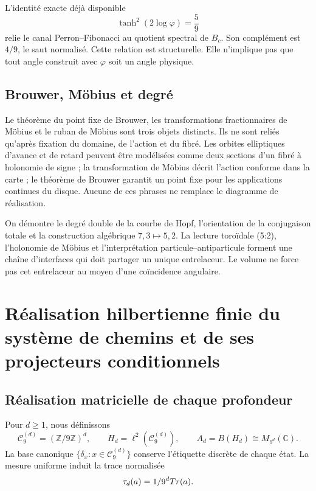 L’identité exacte déjà disponible
\[
\tanh^2(2\log\varphi)=\frac59
\]
relie le canal Perron--Fibonacci au quotient spectral de \(B_c\). Son
complément est \(4/9\), le saut normalisé. Cette relation est structurelle.
Elle n’implique pas que tout angle construit avec \(\varphi\) soit un angle physique.

\subsection{Brouwer, Möbius et degré}

Le théorème du point fixe de Brouwer, les transformations fractionnaires de
Möbius et le ruban de Möbius sont trois objets distincts. Ils ne sont reliés
qu’après fixation du domaine, de l’action et du fibré. Les orbites elliptiques d’avance et de
retard peuvent être modélisées comme deux sections d’un fibré à holonomie de
signe ; la transformation de Möbius décrit l’action conforme dans la carte ;
le théorème de Brouwer garantit un point fixe pour les applications continues du disque.
Aucune de ces phrases ne remplace le diagramme de réalisation.

\begin{fronteraBox}[title={Résultat et frontière}]
On démontre le degré double de la courbe de Hopf, l’orientation de la
conjugaison totale et la construction algébrique \(7,3\mapsto5,2\). La lecture
toroïdale (5{:}2), l’holonomie de Möbius et l’interprétation
particule--antiparticule forment une chaîne d’interfaces qui doit partager un
unique entrelaceur. Le volume ne force pas cet entrelaceur au moyen d’une
coïncidence angulaire.
\end{fronteraBox}


\section{Réalisation hilbertienne finie du système de chemins et de ses projecteurs conditionnels}

\subsection{Réalisation matricielle de chaque profondeur}

Pour \(d\ge1\), nous définissons
\[
  \mathcal C_9^{(d)}=(\mathbb Z/9\mathbb Z)^d,
  \qquad
  H_d=\ell^2(\mathcal C_9^{(d)}),
  \qquad
  A_d=B(H_d)\cong M_{9^d}(\mathbb C).
\]
La base canonique \(\{\delta_x:x\in\mathcal C_9^{(d)}\}\) conserve
l’étiquette discrète de chaque état. La mesure uniforme induit la trace
normalisée
\[
  \tau_d(a)=1/9^dTr(a).
\]

